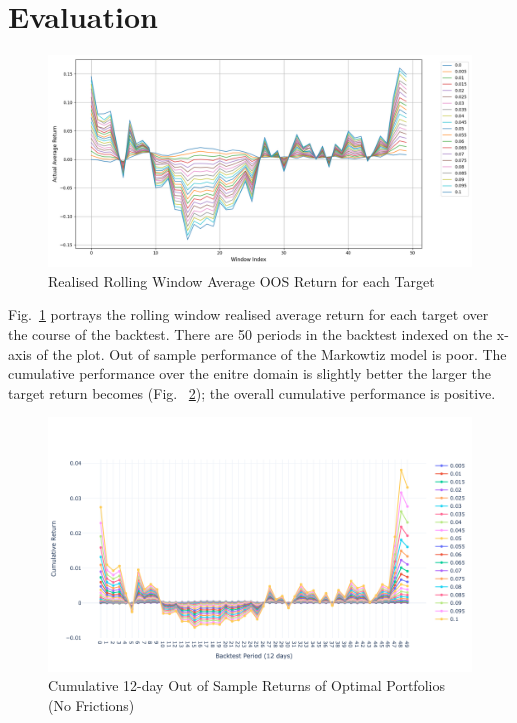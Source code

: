 \documentclass[12pt,twoside]{article}
\begin{document}
\section{Evaluation}

\begin{figure}[htbp!]
\centering
\includegraphics[width = 1.0\hsize]{./figures/Realised_Rolling_Window_Average_OOS_Return_cpp.png} %
\caption{Realised Rolling Window Average OOS Return for each Target} 
\label{fig:OOS_rets}
\end{figure}


Fig.~\ref{fig:OOS_rets} portrays the rolling window realised average return for each target over the course of the backtest. There are 50 periods in the backtest indexed on the x-axis of the plot. Out of sample performance of the Markowtiz model is poor. The cumulative performance over the enitre domain is slightly better the larger the target return becomes (Fig. ~\ref{fig:cuml_rets}); the overall cumulative performance is positive.\\

\begin{figure}[]
\centering 
\includegraphics[width = 1.0\hsize]{./figures/Cumulative_returns.png} 
\caption{Cumulative 12-day Out of Sample Returns of Optimal Portfolios (No Frictions)}
\label{fig:cuml_rets}
\end{figure}
\end{document}

